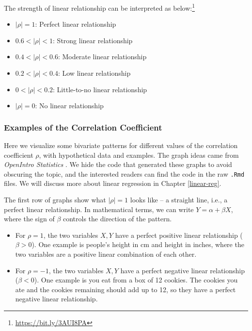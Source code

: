 \documentclass[
]{article}
\begin{document}
The strength of linear relationship can be interpreted as
below:\footnote{\url{https://bit.ly/3AUI8PA}}

\begin{itemize}
\item
  \(|\rho| = 1\): Perfect linear relationship
\item
  \(0.6 < |\rho| < 1\): Strong linear relationship
\item
  \(0.4 < |\rho| < 0.6\): Moderate linear relationship
\item
  \(0.2 < |\rho| < 0.4\): Low linear relationship
\item
  \(0 < |\rho| < 0.2\): Little-to-no linear relationship
\item
  \(|\rho| = 0\): No linear relationship
\end{itemize}

\hypertarget{examples-of-the-correlation-coefficient}{%
\subsubsection{Examples of the Correlation
Coefficient}\label{examples-of-the-correlation-coefficient}}

Here we visualize some bivariate patterns for different values of the
correlation coefficient \(\rho\), with hypothetical data and examples.
The graph ideas came from \emph{OpenIntro Statistics}
\citep{diez2019openintro}. We hide the code that generated these graphs
to avoid obscuring the topic, and the interested readers can find the
code in the raw \texttt{.Rmd} files. We will discuss more about linear
regression in Chapter \ref{linear-reg}.

The first row of graphs show what \(|\rho| = 1\) looks like -- a
straight line, i.e., a perfect linear relationship. In mathematical
terms, we can write \(Y = \alpha + \beta X\), where the sign of
\(\beta\) controls the direction of the pattern.

\begin{itemize}
\item
  For \(\rho = 1\), the two variables \(X, Y\) have a perfect positive
  linear relationship (\(\beta > 0\)). One example is people's height in
  cm and height in inches, where the two variables are a positive linear
  combination of each other.
\item
  For \(\rho = -1\), the two variables \(X, Y\) have a perfect negative
  linear relationship (\(\beta < 0\)). One example is you eat from a box
  of 12 cookies. The cookies you ate and the cookies remaining should
  add up to 12, so they have a perfect negative linear relationship.
\end{itemize}
\end{document}
